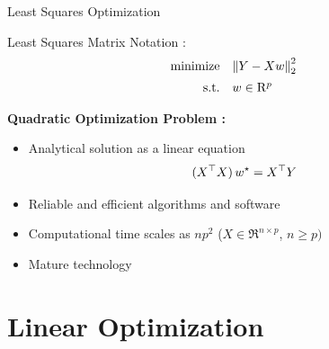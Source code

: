\documentclass[9pt]{beamer}
\begin{document}
\begin{frame}{Least Squares Optimization}

  \begin{minipage}{1\textwidth}
    Least Squares Matrix Notation :
    \vfill
    \begin{equation*}
      \begin{array}{rl}
        \operatorname{minimize} & \left\|Y - X w\right\|^2_2\\[0.5em]
        \mathrm{s.t.} & w\in\mathrm{R}^p
      \end{array}
    \end{equation*}
  \end{minipage}%
  \vfill

  \textbf{Quadratic Optimization Problem :}
  \begin{itemize}
  \item Analytical solution as a linear equation
    \[
      (X^\top X)\,w^\star = X^\top Y
    \]

  \item Reliable and efficient algorithms and software
  \item Computational time scales as $n p^2$ ($X\in\Re^{n\times p}$, $n\geq p)$
  \item<2-> Mature technology
  \end{itemize}
  
\end{frame}

\section{Linear Optimization}
\end{document}
